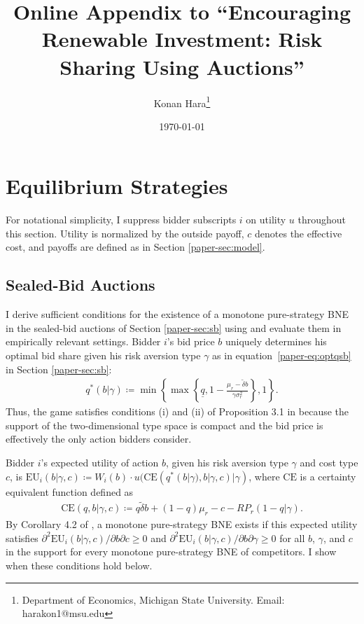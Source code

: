 \documentclass[12pt]{article}
\title{\vspace{-0.5in}Online Appendix to ``Encouraging Renewable Investment: Risk Sharing Using Auctions''}
\author{Konan Hara\footnote{Department of Economics, Michigan State University. Email: harakon1@msu.edu}}
\date{\today}
\theoremstyle{definition} %
\begin{document}
\maketitle

\appendix
\setcounter{page}{1}
\renewcommand{\thepage}{A-\arabic{page}}
\renewcommand{\theequation}{\thesection\arabic{equation}}

\section{Equilibrium Strategies}

For notational simplicity, I suppress bidder subscripts $i$ on utility $u$ throughout this section. Utility is normalized by the outside payoff, $c$ denotes the effective cost, and payoffs are defined as in Section \ref{paper-sec:model}.

\subsection{Sealed-Bid Auctions}
\label{sec:eqsb}

I derive sufficient conditions for the existence of a monotone pure-strategy BNE in the sealed-bid auctions of Section \ref{paper-sec:sb} using \citet{Reny2011} and evaluate them in empirically relevant settings. Bidder $i $'s bid price $b$ uniquely determines his optimal bid share given his risk aversion type $\gamma$ as in equation~\eqref{paper-eq:optqsb} in Section \ref{paper-sec:sb}:
\begin{align*}
q^\ast(b|\gamma) \coloneqq \min \left\{\max \left\{\underline{q}, 1 - \frac{\mu_r - \tilde{\delta} b}{\gamma \sigma_r^2} \right\}, 1 \right\}.
\end{align*}
Thus, the game satisfies conditions (i) and (ii) of Proposition 3.1 in \citet{Reny2011} because the support of the two-dimensional type space is compact and the bid price is effectively the only action bidders consider. 

Bidder $i $'s expected utility of action $b $, given his risk aversion type $\gamma$ and cost type $c$, is $\mathrm{EU}_i(b|\gamma,c) \coloneqq W_i(b) \cdot u(\mathrm{CE}(q^\ast(b|\gamma),b|\gamma,c)|\gamma)$, where $\mathrm{CE} $ is a certainty equivalent function defined as
\begin{align*}
\mathrm{CE}(q,b|\gamma,c) \coloneqq q \tilde{\delta} b + (1 - q) \mu_r - c - RP_r(1-q|\gamma).
\end{align*}
By Corollary 4.2 of \citet{Reny2011}, a monotone pure-strategy BNE exists if this expected utility satisfies $\partial^2 \mathrm{EU}_i(b|\gamma,c)/\partial b \partial c \geq 0 $ and $\partial^2 \mathrm{EU}_i(b|\gamma,c)/\partial b \partial \gamma \geq 0 $ for all $b$, $\gamma $, and $c$ in the support for every monotone pure-strategy BNE of competitors. I show when these conditions hold below.
\end{document}
